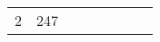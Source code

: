 \documentclass[12pt]{article}
\begin{document}
{\begin{tabular}{|c|c|c|c|c|c|c|c|}
        \multirow{2}{*}{2}  & \multirow{2}{*}{247}    &                                               & \multicolumn{1}{c}{}                                 & \multicolumn{1}{c}{}                           & \multicolumn{1}{c}{}                           & \multicolumn{1}{c}{}                           &                                               \\\cline{3-3}
                            &                         & \multicolumn{1}{c}{}                          & \multicolumn{1}{c}{}                                 & \multicolumn{1}{c}{}                           & \multicolumn{1}{c}{}                           & \multicolumn{1}{c}{}                           &                                               \\\hline
    \end{tabular}
}\\\\
\end{document}

